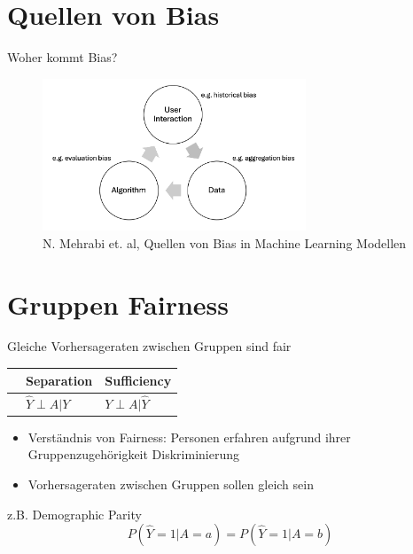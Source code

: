 \documentclass[aspectratio=169]{beamer}
\begin{document}
\section{Quellen von Bias}
\begin{frame}{Woher kommt Bias?}
	\begin{figure}
		\centering
		\includegraphics[width=0.7\textwidth]{../figures/bias_loop.png}
		\caption{N. Mehrabi et. al, Quellen von Bias in Machine Learning Modellen}
	\end{figure}
\end{frame}



\section{Gruppen Fairness}
\begin{frame}[t]{Gleiche Vorhersageraten zwischen Gruppen sind fair} %
    \vspace*{0.3cm} %
	\begin{table}
        \begin{tabular}{lll}
            \toprule
            \color{orange}{Independence} & Separation & Sufficiency \\
            \midrule
            \color{orange}{$\hat{Y} \perp A$} & $\hat{Y} \perp A | Y$ & $Y \perp A | \hat{Y}$\\
            \bottomrule
        \end{tabular}
    \end{table}
	\begin{itemize}
		\item Verständnis von Fairness: Personen erfahren aufgrund ihrer Gruppenzugehörigkeit Diskriminierung
		\item Vorhersageraten zwischen Gruppen sollen gleich sein
	\end{itemize}
	z.B. Demographic Parity \\
	$$P(\hat{Y} = 1 | A = a) = P(\hat{Y} = 1 | A = b)$$
\end{frame}
\end{document}
